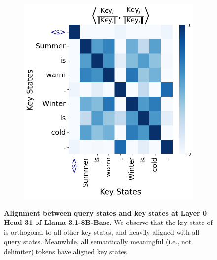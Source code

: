 \begin{figure}[h]
\begin{subfigure}[t]{0.49\textwidth}
        \includegraphics[width=\textwidth]{Figures/llama_31_circuit/llama_31_kk_l0.png}
    \end{subfigure}
    \caption{\small \textbf{Alignment between query states and key states at Layer 0 Head 31 of Llama 3.1-8B-Base.} We observe that the key state of \bos{} is orthogonal to all other key states, and heavily aligned with all query states. Meanwhile, all semantically meaningful (i.e., not delimiter) tokens have aligned key states.}
    \label{fig:llama_31_qk_kk}
\end{figure}


